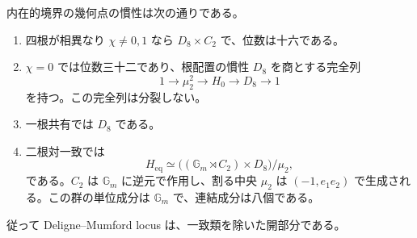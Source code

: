 \begin{proposition}[特殊配置も含む全慣性]
\label{prop:noncubic-all-stabilizers}
内在的境界の幾何点の慣性は次の通りである。
\begin{enumerate}
\item 四根が相異なり $\chi\ne0,1$ なら $D_8\times C_2$ で、位数は十六である。
\item $\chi=0$ では位数三十二であり、根配置の慣性 $D_8$ を商とする完全列
\[
 1\longrightarrow\mu_2^2\longrightarrow H_0\longrightarrow D_8\longrightarrow1
\]
を持つ。この完全列は分裂しない。
\item 一根共有では $D_8$ である。
\item 二根対一致では
\begin{equation}\label{eq:noncubic-coincident-full-stabilizer}
 H_{\mathrm{eq}}\simeq
 \bigl((\mathbb G_m\rtimes C_2)\times D_8\bigr)/\mu_2,
\end{equation}
である。$C_2$ は $\mathbb G_m$ に逆元で作用し、割る中央 $\mu_2$ は
$(-1,e_1e_2)$ で生成される。この群の単位成分は $\mathbb G_m$ で、連結成分は八個である。
\end{enumerate}
従って Deligne--Mumford locus は、一致類を除いた開部分である。
\end{proposition}

